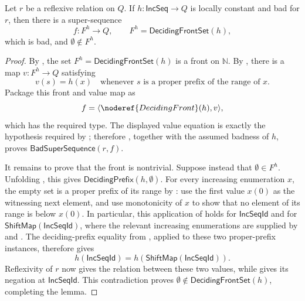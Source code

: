 \begin{lemma}
Let $r$ be a reflexive relation on $Q$.  If
$h:\mathsf{IncSeq}\to Q$ is locally constant and bad for $r$, then there is
a super-sequence
\[
f:F^h\to Q,
\qquad F^h=\mathsf{DecidingFrontSet}(h),
\]
which is bad, and $\emptyset\notin F^h$.
\end{lemma}
\begin{proof}
By , the set
$F^h=\mathsf{DecidingFrontSet}(h)$ is a front on $\mathbb N$.  By
, there is a map
$v:F^h\to Q$ satisfying
\[
v(s)=h(x)
\quad\text{whenever }s\text{ is a proper prefix of the range of }x.
\]
Package this front and value map as
\[
f=\langle \noderef{DecidingFront}(h),v\rangle,
\]
which has the required  type.  The displayed value
equation is exactly the hypothesis required by ;
therefore , together with the assumed
 badness of $h$, proves
$\mathsf{BadSuperSequence}(r,f)$.

It remains to prove that the front is nontrivial.  Suppose instead that
$\emptyset\in F^h$.  Unfolding , this gives
$\mathsf{DecidingPrefix}(h,\emptyset)$.  For every increasing enumeration
$x$, the empty set is a proper prefix of its range by : use the first value
$x(0)$ as the witnessing next element, and use monotonicity of $x$ to show
that no element of its range is below $x(0)$.  In particular, this application of
 holds for
$\mathsf{IncSeqId}$ and for $\mathsf{ShiftMap}(\mathsf{IncSeqId})$, where
the relevant increasing enumerations are supplied by
 and .  The deciding-prefix equality from
, applied to these two proper-prefix instances,
therefore gives
\[
h(\mathsf{IncSeqId})
=h(\mathsf{ShiftMap}(\mathsf{IncSeqId})).
\]
Reflexivity of $r$ now gives the relation between these two values, while
 gives its negation at
$\mathsf{IncSeqId}$.  This contradiction proves
$\emptyset\notin\mathsf{DecidingFrontSet}(h)$, completing the lemma.
\end{proof}
